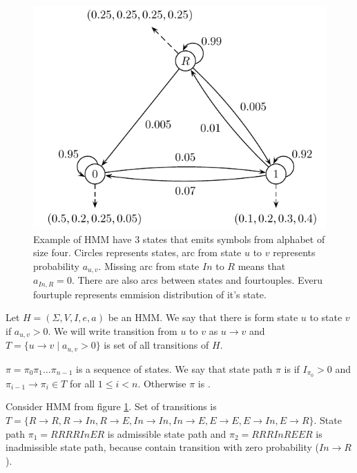 \begin{figure}
\begin{center}
\includegraphics{../figures/exampleHMM.pdf}
\end{center}
\caption[Example of simple Hidden Markov Model]{
Example of HMM have $3$ states
that emits symbols from alphabet of size four.  Circles represents states, arc
from state $u$ to $v$ represents probability $a_{u,v}$. Missing arc from state
$In$ to $R$ means that $a_{In,R}=0$.  There are also arcs between states and
fourtouples. Everu fourtuple represents emmision distribution of it's state.
}\label{FIGURE:EXAMPLEHMM} 
\end{figure}


\begin{definition}\label{DEF:STATEPATH}
Let $H=(\Sigma,V,I,e,a)$ be an HMM. We say that there is 
form state $u$ to state $v$ if $a_{u,v}>0$. We will write transition from $u$ to
$v$ as $u\to v$ and $T=\{u\to v\mid a_{u,v}>0\}$ is set of all transitions of
$H$.

 $\pi=\pi_0\pi_1\dots\pi_{n-1}$ is a sequence of
states. We say that state path $\pi$ is  if $I_{\pi_0}>0$
and  $\pi_{i-1}\to\pi_i\in T$ for all $1\leq i < n$. Otherwise $\pi$ is
.
\end{definition}

\begin{example}
Consider HMM from figure \ref{FIGURE:EXAMPLEHMM}. Set of transitions is
$T=\{R\to R,R\to In, R\to E,In\to In, In\to E, E\to E, E\to In, E\to R\}$.
State path $\pi_1=RRRRInER$ is admissible state path and $\pi_2=RRRInREER$ is inadmissible
state path, because contain transition with zero probability ($In\to R$).
\end{example}




